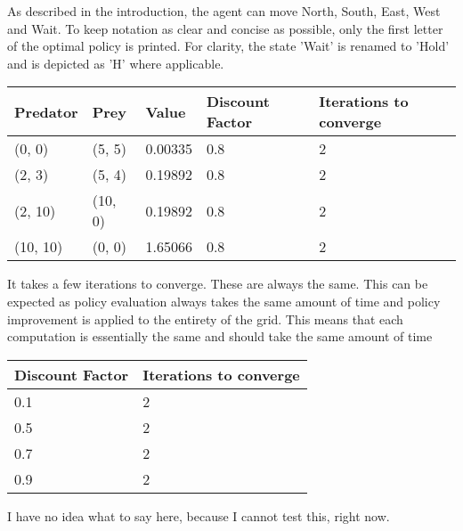 \documentclass{article}
\begin{document}
As described in the introduction, the agent can move North, South, East, West and Wait. To keep notation as clear and concise as possible, only the first letter of the optimal policy is printed. For clarity, the state 'Wait' is renamed to 'Hold' and is depicted as 'H' where applicable. 



\begin{center}
	\begin{tabular}{ l | l | l | l | l }
		Predator & Prey & Value & Discount Factor & Iterations to converge \\ 
		\hline
		(0, 0) & (5, 5) & 0.00335 & 0.8 & 2 \\
		(2, 3) & (5, 4) & 0.19892 & 0.8 & 2 \\
		(2, 10) & (10, 0) & 0.19892 & 0.8 & 2 \\
		(10, 10) & (0, 0) & 1.65066 & 0.8 & 2 \\	
	\end{tabular}
\end{center}

It takes a few iterations to converge. These are always the same. This can be expected as policy evaluation always takes the same amount of time and policy improvement is applied to the entirety of the grid. This means that each computation is essentially the same and should take the same amount of time

\begin{center}
	\begin{tabular}{ l || l }
		Discount Factor & Iterations to converge \\ 
		\hline
		0.1 & 2 \\
		0.5 & 2 \\
		0.7 & 2 \\
		0.9 & 2 \\	
	\end{tabular}
\end{center}

I have no idea what to say here, because I cannot test this, right now.
\end{document}
